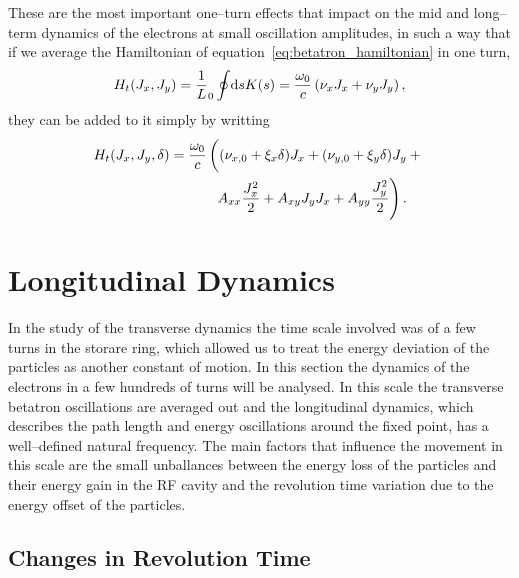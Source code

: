     These are the most important one--turn effects that impact on the mid and long--term dynamics of the electrons at small oscillation amplitudes, in such a way that if we average the Hamiltonian of equation~\eqref{eq:betatron_hamiltonian} in one turn,
    \begin{align}
        H_t(J_x, J_y) = \frac1L_0\oint\!\text{d}s K(s) = \frac{\omega_0}{c}\left(\nu_xJ_x + \nu_yJ_y\right),
    \end{align}
    they can be added to it simply by writting
    \begin{align}\label{eq:average_transverse_hamiltonian}\nonumber
        H_t(J_x, J_y, \delta) = \frac{\omega_0}{c}
                                &\left(
                                    (\nu_{x,0} + \xi_x \delta) J_x +
                                    (\nu_{y,0} + \xi_y \delta) J_y +
                                \vphantom{\frac{1_1^2}{2}}\right.\\ &\left.
                              \,\,\,A_{xx} \frac{J_x^2}{2} + A_{xy} J_yJ_x +
                                    A_{yy} \frac{J_y^2}{2}
                                \right).
    \end{align}

\section{Longitudinal Dynamics}

    In the study of the transverse dynamics the time scale involved was of a few turns in the storare ring, which allowed us to treat the energy deviation of the particles as another constant of motion. In this section the dynamics of the electrons in a few hundreds of turns will be analysed. In this scale the transverse betatron oscillations are averaged out and the longitudinal dynamics, which describes the path length and energy oscillations around the fixed point, has a well--defined natural frequency. The main factors that influence the movement in this scale are the small unballances between the energy loss of the particles and their energy gain in the RF cavity and the revolution time variation due to the energy offset of the particles.

\subsection{Changes in Revolution Time}\label{sec:longitudinal_deviations}

